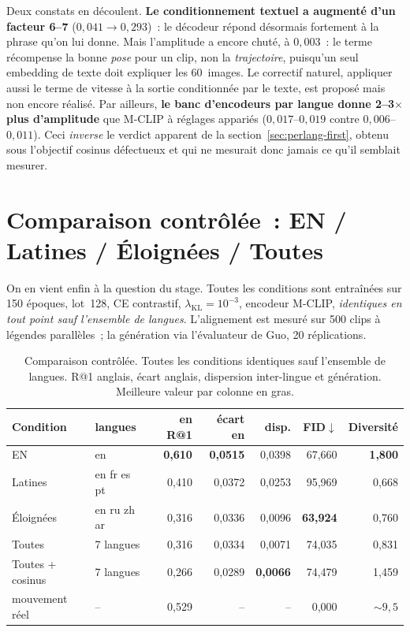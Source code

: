 \documentclass[12pt,a4paper,oneside]{report}
\theoremstyle{definition}
\theoremstyle{plain}
\newcommand{\lkl}{\ensuremath{\lambda_{\mathrm{KL}}}}
\begin{document}
Deux constats en découlent. \textbf{Le conditionnement textuel a augmenté d'un
facteur 6--7} ($0{,}041\to0{,}293$)~: le décodeur répond désormais fortement à la
phrase qu'on lui donne. Mais l'amplitude a encore chuté, à $0{,}003$~: le terme
récompense la bonne \emph{pose} pour un clip, non la \emph{trajectoire}, puisqu'un
seul embedding de texte doit expliquer les 60~images. Le correctif naturel,
appliquer aussi le terme de vitesse à la sortie conditionnée par le texte, est
proposé mais non encore réalisé. Par ailleurs, \textbf{le banc d'encodeurs par
langue donne 2--3$\times$ plus d'amplitude} que M-CLIP à réglages appariés
($0{,}017$--$0{,}019$ contre $0{,}006$--$0{,}011$). Ceci \emph{inverse} le verdict
apparent de la section~\ref{sec:perlang-first}, obtenu sous l'objectif cosinus
défectueux et qui ne mesurait donc jamais ce qu'il semblait mesurer.

\section{Comparaison contrôlée~: EN / Latines / Éloignées / Toutes}
\label{sec:controlee}

On en vient enfin à la question du stage. Toutes les conditions sont entraînées
sur 150 époques, lot~128, CE contrastif, $\lkl=10^{-3}$, encodeur M-CLIP,
\emph{identiques en tout point sauf l'ensemble de langues}. L'alignement est mesuré
sur 500 clips à légendes parallèles~; la génération via l'évaluateur de Guo,
20 réplications.

\begin{table}[ht]
\centering
\caption{Comparaison contrôlée. Toutes les conditions identiques sauf l'ensemble
de langues. R@1 anglais, écart anglais, dispersion inter-lingue et génération.
Meilleure valeur par colonne en gras.}
\label{tab:controlee}
\small
\begin{tabular}{@{}llrrrrr@{}}
\toprule
Condition & langues & en R@1 & écart en & disp. & FID$\downarrow$ & Diversité \\
\midrule
EN              & en          & \textbf{0,610} & \textbf{0,0515} & 0,0398 & 67,660 & \textbf{1,800} \\
Latines         & en fr es pt & 0,410 & 0,0372 & 0,0253 & 95,969 & 0,668 \\
Éloignées       & en ru zh ar & 0,316 & 0,0336 & 0,0096 & \textbf{63,924} & 0,760 \\
Toutes          & 7 langues   & 0,316 & 0,0334 & 0,0071 & 74,035 & 0,831 \\
Toutes + cosinus& 7 langues   & 0,266 & 0,0289 & \textbf{0,0066} & 74,479 & 1,459 \\
mouvement réel  & --          & 0,529 & --    & --    & 0,000 & ${\sim}9,5$ \\
\bottomrule
\end{tabular}
\end{table}
\end{document}
